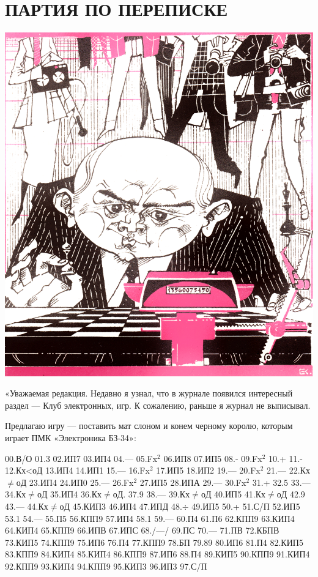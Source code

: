 \documentclass[11pt,a4paper,oneside]{article}
\begin{document}
\section{ПАРТИЯ ПО ПЕРЕПИСКЕ}
\includegraphics[width=\textwidth]{mail1}

«Уважаемая редакция. Недавно я узнал, что в журнале появился интересный раздел — Клуб электронных, игр. К сожалению, раньше я журнал не выписывал.

Предлагаю игру — поставить мат слоном и конем черному королю, которым играет ПМК «Электроника БЗ-34»:

00.В/О 01.3 02.ИП7 03.ИП4 04.— 05.Fx$^{2}$ 06.ИП8 07.ИП5 08.- 09.Fx$^{2}$
10.+ 11.- 12.Кх<оД 13.ИП4 14.ИП1 15.—	16.Fx$^{2}$ 17.ИП5 18.ИП2	19.—
20.Fx$^{2}$ 21.— 22.Кх$\neq$оД 23.ИП4 24.ИП0 25.— 26.Fx$^{2}$ 27.ИП5 28.ИПА 29.— 30.Fx$^{2}$ 31.+ 32.5 33.— 34.Кх$\neq$оД
35.ИП4 36.Кх$\neq$оД. 37.9 38.—
39.Кх$\neq$оД 40.ИП5 41.Кх$\neq$оД 42.9
43.— 44.Кх$\neq$оД 45.КИП3 46.ИП4 47.ИПД 48.$\div$ 49.ИП5 50.+ 51.С/П
52.ИП5 53.1 54.— 55.П5 56.КПП9
57.ИП4 58.1 59.— 60.П4 61.П6 62.КПП9 63.КИП4 64.КИП4 65.КПП9 66.ИПВ 67.ИПС 68./—/ 69.ПС 70.— 71.ПВ 72.КБПВ 73.КИП5 74.КПП9 75.ИП6 76.П4 77.КПП9 78.БП 79.89 80.ИП6 81.П4 82.КИП5 83.КПП9 84.КИП4
85.КИП4 86.КПП9 87.ИП6 88.П4
89.КИП5 90.КПП9 91.КИП4 92.КПП9 93.КИП4 94.КПП9 95.КИП3 96.ИП3 97.С/П
\end{document}
